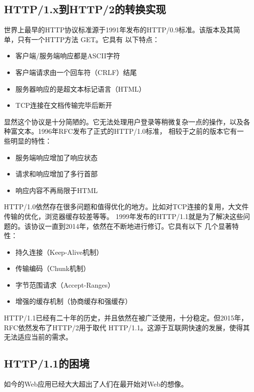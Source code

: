 \documentclass[twoside]{CUGThesis}
\begin{document}
	\begin{spacing}{2}
		\section{HTTP/1.x到HTTP/2的转换实现}
	\end{spacing}
	世界上最早的HTTP协议标准源于1991年发布的HTTP/0.9标准。该版本及其简单，只有一个HTTP方法 GET。它具有
	以下特点：
	\begin{itemize}
		\item 客户端/服务端响应都是ASCII字符
		\item 客户端请求由一个回车符（CRLF）结尾
		\item 服务器响应的是超文本标记语言（HTML）
		\item TCP连接在文档传输完毕后断开
	\end{itemize}
	\par
	显然这个协议是十分简陋的。它无法处理用户登录等稍微复杂一点的操作，以及各种富文本。1996年RFC发布了正式的HTTP/1.0标准，
	相较于之前的版本它有一些明显的特性：
	\begin{itemize}
		\item 服务端响应增加了响应状态
		\item 请求和响应增加了多行首部
		\item 响应内容不再局限于HTML
	\end{itemize}
	\par
	HTTP/1.0依然存在很多问题和值得优化的地方。比如对TCP连接的复用，大文件传输的优化，浏览器缓存较差等等。
	1999年发布的HTTP/1.1就是为了解决这些问题的。该协议一直到2014年，依然在不断地进行修订。它具有以下
	几个显著特性：
	\begin{itemize}
		\item 持久连接（Keep-Alive机制）
		\item 传输编码（Chunk机制）
		\item 字节范围请求（Accept-Ranges）
		\item 增强的缓存机制（协商缓存和强缓存）
	\end{itemize}
	\par
	HTTP/1.1已经有二十年的历史，并且依然在被广泛使用，十分稳定。但2015年，RFC依然发布了HTTP/2用于取代
	HTTP/1.1。这源于互联网快速的发展，使得其无法适应当前的需求。

	\subsection{HTTP/1.1的困境}
	如今的Web应用已经大大超出了人们在最开始对Web的想像。
\end{document}
